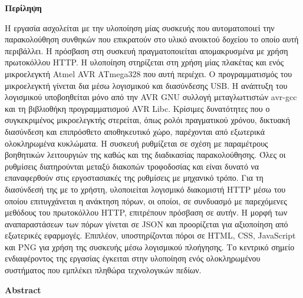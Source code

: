 \thispagestyle{empty}

\begin{center}{\bfseries Περίληψη}\end{center}

\noindent
Η εργασία ασχολείται με την υλοποίηση μίας συσκευής που αυτοματοποιεί την
παρακολούθηση συνθηκών που επικρατούν στο υλικό ανοικτού δοχείου το οποίο αυτή
περιβάλλει. Η πρόσβαση στη συσκευή πραγματοποιείται απομακρυσμένα με χρήση
πρωτοκόλλου HTTP.
%
Η υλοποίηση στηρίζεται στη χρήση μίας πλακέτας  και ενός
μικροελεγκτή Atmel AVR ATmega328 που αυτή περιέχει. Ο προγραμματισμός του
μικροελεγκτή γίνεται δια μέσω λογισμικού  και διασύνδεσης USB.
Η ανάπτυξη του λογισμικού υποβοηθείται μόνο από την AVR GNU συλλογή
μεταγλωττιστών avr-gcc και τη βιβλιοθήκη προγραμματισμού AVR Libc. Κρίσιμες
δυνατότητες που ο συγκεκριμένος μικροελεγκτής στερείται, όπως ρολόι πραγματικού
χρόνου, δικτυακή διασύνδεση και επιπρόσθετο αποθηκευτικό χώρο, παρέχονται από
εξωτερικά ολοκληρωμένα κυκλώματα.
%
Η συσκευή ρυθμίζεται σε σχέση με παραμέτρους βοηθητικών λειτουργιών της καθώς
και της διαδικασίας παρακολούθησης. Όλες οι ρυθμίσεις διατηρούνται μεταξύ
διακοπών τροφοδοσίας και είναι δυνατό να επαναφερθούν στις εργοστασιακές
της ρυθμίσεις με μηχανικό τρόπο.
%
Για τη διασύνδεσή της με το χρήστη, υλοποιείται λογισμικό διακομιστή HTTP μέσω
του οποίου επιτυγχάνεται η ανάκτηση πόρων, οι οποίοι, σε συνδυασμό με
παρεχόμενες μεθόδους του πρωτοκόλλου HTTP, επιτρέπουν πρόσβαση σε αυτήν.
Η μορφή των αναπαραστάσεων των πόρων γίνεται σε JSON και προορίζεται για
αξιοποίηση από εξωτερικές εφαρμογές. Επιπλέον, υποστηρίζονται πόροι σε HTML,
CSS, JavaScript και PNG για χρήση της συσκευής μέσω λογισμικού πλοήγησης.
%
Το κεντρικό σημείο ενδιαφέροντος της εργασίας έγκειται στην υλοποίηση ενός
ολοκληρωμένου συστήματος που εμπλέκει πληθώρα τεχνολογικών πεδίων.

\clearpage
\thispagestyle{empty}

\begin{center}{\bfseries Abstract}\end{center}

